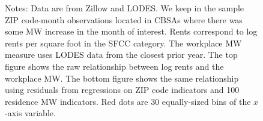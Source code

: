 \documentclass{article}
\begin{document}
\begin{figure}[h!]
    \begin{minipage}{.95\textwidth} \footnotesize
        \vspace{3mm}
        Notes: Data are from Zillow and LODES.
        We keep in the sample ZIP code-month observations located in CBSAs 
        where there was some MW increase in the month of interest. 
        Rents correspond to log rents per square foot in the SFCC category.
        The workplace MW measure uses LODES data from the closest prior year.
        The top figure shows the raw relationship between log rents
        and the workplace MW.
        The bottom figure shows the same relationship using residuals from 
        regressions on ZIP code indicators and 100 residence MW indicators.
        Red dots are 30 equally-sized bins of the $x$-axis variable.
    \end{minipage}
\end{figure}
\end{document}
